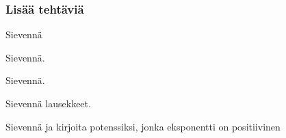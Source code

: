 \begin{tehtavasivu}
\subsubsection*{Lisää tehtäviä}

 \begin{tehtava}
        Sievennä

        \begin{vastaus}
        \end{vastaus}
\end{tehtava}
\begin{tehtava}
        Sievennä.
        \begin{vastaus}
        \end{vastaus}
    \end{tehtava}

    \begin{tehtava}
        Sievennä.
        \begin{vastaus}
        \end{vastaus}
    \end{tehtava}
      
    \begin{tehtava}
        Sievennä lausekkeet.
        \begin{vastaus}
        \end{vastaus}
    \end{tehtava}
    
\begin{tehtava}
         Sievennä ja kirjoita potenssiksi, jonka eksponentti on positiivinen
        \begin{vastaus}
        \end{vastaus}
\end{tehtava}
    

\end{tehtavasivu}
